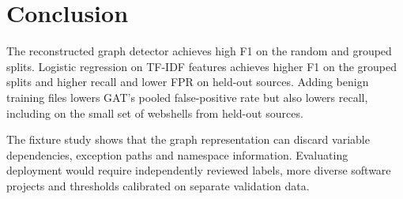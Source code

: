\section{Conclusion}\label{sec:conclusion}
The reconstructed graph detector achieves high F1 on the random and grouped splits. Logistic regression
on TF-IDF features achieves higher F1 on the grouped splits and higher recall and lower FPR on held-out
sources. Adding benign training files lowers GAT's pooled false-positive rate but also lowers recall,
including on the small set of webshells from held-out sources.

The fixture study shows that the graph representation can discard variable dependencies, exception paths
and namespace information. Evaluating deployment would require independently reviewed labels, more diverse
software projects and thresholds calibrated on separate validation data.
